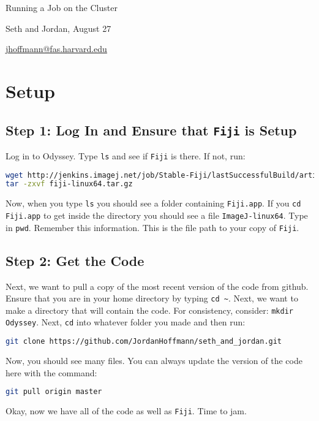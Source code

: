 \documentclass[11pt]{article}
\begin{document}
\begin{center}\Large{Running a Job on the Cluster}\end{center}
\begin{center}Seth and Jordan, August 27\end{center}
\begin{center}\small{\url{jhoffmann@fas.harvard.edu}}\end{center}
\section*{Setup}
\subsection*{Step 1: Log In and Ensure that \texttt{Fiji} is Setup}
Log in to Odyssey. Type \texttt{ls} and see if \texttt{Fiji} is there. If not, run:
\begin{lstlisting}[language=bash, caption=Download \texttt{Fiji}]
wget http://jenkins.imagej.net/job/Stable-Fiji/lastSuccessfulBuild/artifact/fiji-linux64.tar.gz
tar -zxvf fiji-linux64.tar.gz
\end{lstlisting}
Now, when you type \texttt{ls} you should see a folder containing \texttt{Fiji.app}. If you \texttt{cd Fiji.app} to get inside the directory you should see a file \texttt{ImageJ-linux64}. Type in \texttt{pwd}. Remember this information. This is the file path to your copy of \texttt{Fiji}.

\subsection*{Step 2: Get the Code}
Next, we want to pull a copy of the most recent version of the code from github. Ensure that you are in your home directory by typing \texttt{cd \~}. Next, we want to make a directory that will contain the code. For consistency, consider: \texttt{mkdir Odyssey}. Next, \texttt{cd} into whatever folder you made and then run:
\begin{lstlisting}[language=bash, caption=Setup Github Repository]
git clone https://github.com/JordanHoffmann/seth_and_jordan.git
\end{lstlisting}
Now, you should see many files. You can always update the version of the code here with the command:
\begin{lstlisting}[language=bash, caption=Setup Github Repository]
git pull origin master
\end{lstlisting}
Okay, now we have all of the code as well as \texttt{Fiji}. Time to jam.
\end{document}
